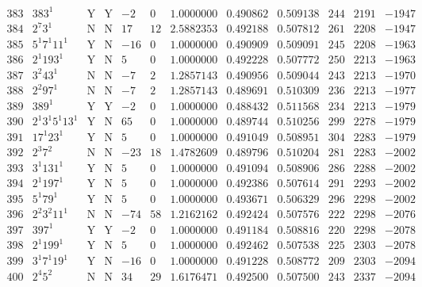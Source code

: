 \documentclass[11pt,reqno,a4letter]{article}
\numberwithin{figure}{section}
\numberwithin{table}{section}
\theoremstyle{plain}
\numberwithin{theorem}{section}
\theoremstyle{definition}
\begin{document}
\begin{table}[ht]
\begin{equation*}
{\begin{array}{cc|cc|ccc|cc|ccc}
 383 & 383^1 & \text{Y} & \text{Y} & -2 & 0 & 1.0000000 & 0.490862 & 0.509138 & 244 & 2191 & -1947 \\
 384 & 2^7 3^1 & \text{N} & \text{N} & 17 & 12 & 2.5882353 & 0.492188 & 0.507812 & 261 & 2208 & -1947 \\
 385 & 5^1 7^1 11^1 & \text{Y} & \text{N} & -16 & 0 & 1.0000000 & 0.490909 & 0.509091 & 245 & 2208 & -1963 \\
 386 & 2^1 193^1 & \text{Y} & \text{N} & 5 & 0 & 1.0000000 & 0.492228 & 0.507772 & 250 & 2213 & -1963 \\
 387 & 3^2 43^1 & \text{N} & \text{N} & -7 & 2 & 1.2857143 & 0.490956 & 0.509044 & 243 & 2213 & -1970 \\
 388 & 2^2 97^1 & \text{N} & \text{N} & -7 & 2 & 1.2857143 & 0.489691 & 0.510309 & 236 & 2213 & -1977 \\
 389 & 389^1 & \text{Y} & \text{Y} & -2 & 0 & 1.0000000 & 0.488432 & 0.511568 & 234 & 2213 & -1979 \\
 390 & 2^1 3^1 5^1 13^1 & \text{Y} & \text{N} & 65 & 0 & 1.0000000 & 0.489744 & 0.510256 & 299 & 2278 & -1979 \\
 391 & 17^1 23^1 & \text{Y} & \text{N} & 5 & 0 & 1.0000000 & 0.491049 & 0.508951 & 304 & 2283 & -1979 \\
 392 & 2^3 7^2 & \text{N} & \text{N} & -23 & 18 & 1.4782609 & 0.489796 & 0.510204 & 281 & 2283 & -2002 \\
 393 & 3^1 131^1 & \text{Y} & \text{N} & 5 & 0 & 1.0000000 & 0.491094 & 0.508906 & 286 & 2288 & -2002 \\
 394 & 2^1 197^1 & \text{Y} & \text{N} & 5 & 0 & 1.0000000 & 0.492386 & 0.507614 & 291 & 2293 & -2002 \\
 395 & 5^1 79^1 & \text{Y} & \text{N} & 5 & 0 & 1.0000000 & 0.493671 & 0.506329 & 296 & 2298 & -2002 \\
 396 & 2^2 3^2 11^1 & \text{N} & \text{N} & -74 & 58 & 1.2162162 & 0.492424 & 0.507576 & 222 & 2298 & -2076 \\
 397 & 397^1 & \text{Y} & \text{Y} & -2 & 0 & 1.0000000 & 0.491184 & 0.508816 & 220 & 2298 & -2078 \\
 398 & 2^1 199^1 & \text{Y} & \text{N} & 5 & 0 & 1.0000000 & 0.492462 & 0.507538 & 225 & 2303 & -2078 \\
 399 & 3^1 7^1 19^1 & \text{Y} & \text{N} & -16 & 0 & 1.0000000 & 0.491228 & 0.508772 & 209 & 2303 & -2094 \\
 400 & 2^4 5^2 & \text{N} & \text{N} & 34 & 29 & 1.6176471 & 0.492500 & 0.507500 & 243 & 2337 & -2094 \\

\end{array}}
\end{equation*}
\end{table}
\end{document}
